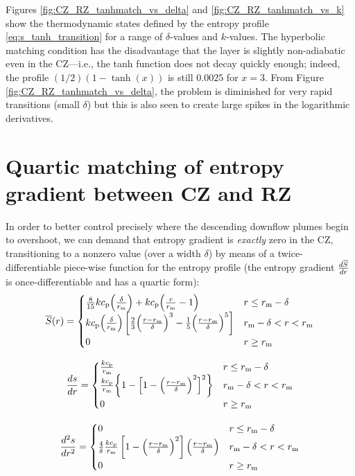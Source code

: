 \documentclass[12pt]{article} %
\newcommand{\rrm}{r_{\rm{m}}}
\begin{document}
Figures \ref{fig:CZ_RZ_tanhmatch_vs_delta} and \ref{fig:CZ_RZ_tanhmatch_vs_k} show the thermodynamic states defined by the entropy profile \eqref{eq:s_tanh_transition} for a range of $\delta$-values and $k$-values. The hyperbolic matching condition has the disadvantage that the layer is slightly non-adiabatic even in the CZ---i.e., the tanh function does not decay quickly enough; indeed, the profile $(1/2)(1-\tanh(x))$ is still $0.0025$ for $x=3$. From Figure \ref{fig:CZ_RZ_tanhmatch_vs_delta}, the problem is diminished for very rapid transitions (small $\delta$) but this is also seen to create large spikes in the logarithmic derivatives. 

\section{Quartic matching of entropy gradient between CZ and RZ}
 In order to better control precisely where the descending downflow plumes begin to overshoot, we can demand that entropy gradient is \textit{exactly} zero in the CZ, transitioning to a nonzero value (over a width $\delta$) by means of a twice-differentiable piece-wise function for the entropy profile (the entropy gradient $\frac{d\overline{S}}{dr}$ is once-differentiable and has a quartic form):
\begin{equation}\label{eq:s_quart_transition}
\sref\ofr = \begin{cases}
\frac{8}{15}k\cp\Big{(}\frac{\delta}{\rrm}\Big{)} + k\cp\Big{(}\frac{r}{\rrm} - 1\Big{)} &r\leq \rrm - \delta\\
k\cp\Big{(}\frac{\delta}{\rrm}\Big{)}\left[\frac{2}{3}\Big{(}\frac{r-\rrm}{\delta}\Big{)}^3 - \frac{1}{5} \Big{(}\frac{r-\rrm}{\delta}\Big{)}^5\right] & \rrm - \delta < r < \rrm\\
0 & r\geq \rrm
\end{cases}
\end{equation}

\begin{equation}\label{eq:dsdr_quart_transition}
\frac{ds}{dr} = \begin{cases}
\frac{k\cp}{\rrm} & r\leq \rrm - \delta\\
\frac{k\cp}{\rrm}\bigg{\{}1 - \Big{[}1 - \Big{(}\frac{r-\rrm}{\delta}\Big{)}^2\Big{]}^2\bigg{\}} & \rrm - \delta < r < \rrm\\
0 & r\geq \rrm
\end{cases}
\end{equation}

\begin{equation}\label{eq:d2sdr2_quart_transition}
\frac{d^2s}{dr^2} = \begin{cases}
0 & r\leq \rrm - \delta\\
\frac{4}{\delta}\frac{k\cp}{\rrm}\left[1 - \Big{(}\frac{r-\rrm}{\delta}\Big{)}^2\right]\Big{(}\frac{r-\rrm}{\delta}\Big{)} & \rrm - \delta < r < \rrm\\
0 & r\geq \rrm
\end{cases}
\end{equation}
\end{document}
